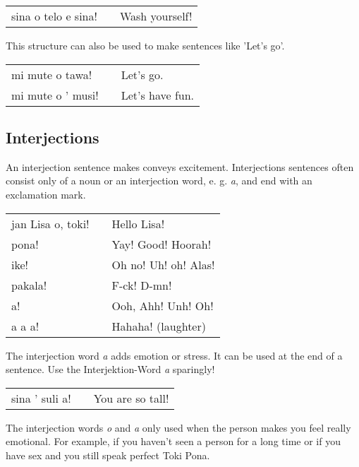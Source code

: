 \begin{supertabular}{p{5,5cm}|ll}
    sina o telo e sina! &  & Wash yourself! \\
\end{supertabular}

This structure can also be used to make sentences like 'Let's go'.

\begin{supertabular}{p{5,5cm}|ll}
    mi mute o tawa!   &  & Let's go.       \\
    mi mute o ' musi! &  & Let's have fun. \\
\end{supertabular}

\subsection*{Interjections}
An interjection sentence makes conveys excitement.
Interjections sentences often consist only of a noun or an interjection word, e. g. \textit{a}, and end with an exclamation mark.

\begin{supertabular}{p{5,5cm}|ll}
    jan Lisa o, toki! &  & Hello Lisa!          \\
    pona!             &  & Yay! Good! Hoorah!   \\
    ike!              &  & Oh no! Uh! oh! Alas! \\
    pakala!           &  & F-ck! D-mn!          \\
    a!                &  & Ooh, Ahh! Unh! Oh!   \\
    a a a!            &  & Hahaha! (laughter)   \\
\end{supertabular}

The interjection word \textit{a} adds emotion or stress.
It can be used at the end of a sentence.
Use the Interjektion-Word \textit{a} sparingly!

\begin{supertabular}{p{5,5cm}|ll}
    sina ' suli a! &  & You are so tall! \\
\end{supertabular}

The interjection words \textit{o} and \textit{a} only used when the person makes you feel really emotional.
For example, if you haven't seen a person for a long time or if you have sex and you still speak perfect Toki Pona.

